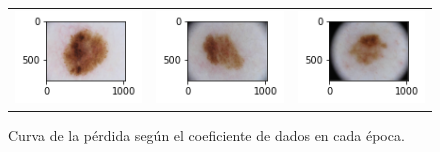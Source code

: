 \begin{figure}[!b]
\begin{tabular}{ccc}
        \includegraphics[width=4cm]{../Plots/THR/sample_6.png} &
        \includegraphics[width=4cm]{../Plots/THR/sample_7.png} &
        \includegraphics[width=4cm]{../Plots/THR/sample_8.png} \\

    \end{tabular}        
    \caption{Curva de la pérdida según el coeficiente de dados en cada época.}
    \label{fig:thresh_input}
\end{figure}

